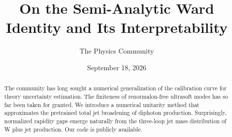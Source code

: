 \documentclass[11pt]{article}
\title{On the Semi-Analytic Ward Identity and Its Interpretability}
\author{The Physics Community}
\date{September 18, 2026}
\numberwithin{equation}{section}
\theoremstyle{definition}
\theoremstyle{remark}
\begin{document}
\maketitle
\begin{abstract}
The community has long sought a numerical generalization of the
calibration curve for theory uncertainty estimation. The finiteness of
renormalon-free ultrasoft modes has so far been taken for granted. We
introduce a numerical unitarity method that approximates the pretrained
total jet broadening of diphoton production. Surprisingly, normalized
rapidity gaps emerge naturally from the three-loop jet mass distribution
of W plus jet production. Our code is publicly available.
\end{abstract}
\tableofcontents




\nocite{*}


\end{document}

